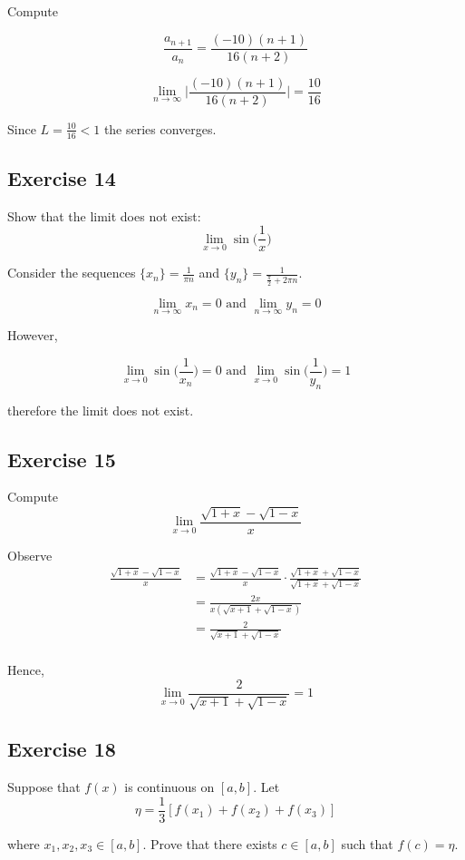 \documentclass{tufte-book}
\theoremstyle{mytheoremstyle}
\theoremstyle{mylemstyle}
\theoremstyle{mydefstyle}
\begin{document}
Compute

\[ \frac{a_{n+1}}{a_n} = \frac{(-10)(n+1)}{16(n+2)} \]

\[  \lim_{n \to \infty} \big| \frac{(-10)(n+1)}{16(n+2)} \big| = \frac{10}{16} \]

Since $L=\frac{10}{16} < 1$ the series converges.

\subsection{Exercise 14}
Show that the limit does not exist:
\[ \lim_{x \to 0} \sin\big(\frac{1}{x}\big) \]

Consider the sequences $\{x_n\} = \frac{1}{\pi n}$ and $\{y_n\} = \frac{1}{\frac{\pi}{2}+2\pi n}$.

\[ \lim_{n \to \infty} x_n = 0 \text{ and } \lim_{n \to \infty} y_n = 0 \]

However,

\[ \lim_{x \to 0} \sin\big(\frac{1}{x_n}\big) = 0 \text{ and } \lim_{x \to 0} \sin\big(\frac{1}{y_n}\big) = 1   \]

therefore the limit does not exist.

\subsection{Exercise 15}
Compute
\[ \lim_{x \to 0} \frac{ \sqrt{1+x} - \sqrt{1-x} }{x} \]

Observe
\begin{align*}
\frac{ \sqrt{1+x} - \sqrt{1-x} }{x} &= \frac{ \sqrt{1+x} - \sqrt{1-x} }{x} \cdot \frac{\sqrt{1+x} + \sqrt{1-x} }{\sqrt{1+x} + \sqrt{1-x} }\\
&= \frac{2x}{x(\sqrt{x+1} + \sqrt{1-x}) }\\
&= \frac{2}{\sqrt{x+1} + \sqrt{1-x}}\\
\end{align*}

Hence,
\[ \lim_{x \to 0} \frac{2}{\sqrt{x+1} + \sqrt{1-x}} = 1 \]

\subsection{Exercise 18}
Suppose  that $f(x)$ is continuous on $[a,b]$.  Let
\[ \eta = \frac{1}{3} [f(x_1) + f(x_2) + f(x_3)] \]

where $x_1, x_2, x_3 \in [a,b]$.  Prove that there exists $c \in [a,b]$ such that $f(c) = \eta$.
\end{document}
